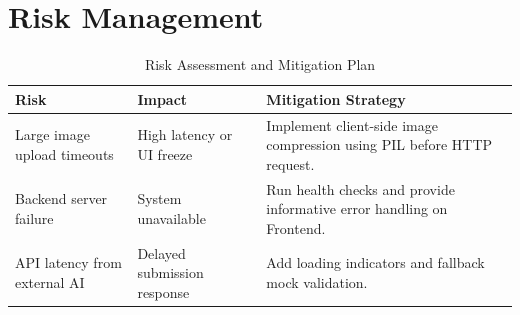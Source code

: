\section{Risk Management}
\begin{table}[h!]
\centering
\renewcommand{\arraystretch}{1.3}
\begin{tabular}{|p{4cm}|p{5cm}|p{5cm}|}
\hline
\textbf{Risk} & \textbf{Impact} & \textbf{Mitigation Strategy} \\ \hline
Large image upload timeouts & High latency or UI freeze & Implement client-side image compression using PIL before HTTP request. \\ \hline
Backend server failure & System unavailable & Run health checks and provide informative error handling on Frontend. \\ \hline
API latency from external AI & Delayed submission response & Add loading indicators and fallback mock validation. \\ \hline
\end{tabular}
\caption{Risk Assessment and Mitigation Plan}
\end{table}